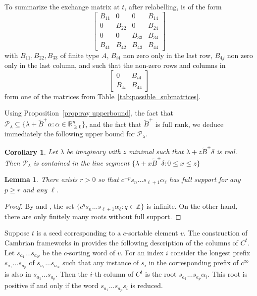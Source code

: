 \documentclass{amsart}
\newcommand{\sayDR}[1]{\say[DR]{\color{red}\;#1}}
\newtheorem{corollary}[theorem]{Corollary}
\newtheorem{lemma}[theorem]{Lemma}
\numberwithin{theorem}{section}
\newcommand{\cP}{\mathcal{P}}
\newcommand{\RR}{\mathbb{R}}
\newcommand{\ZZ}{\mathbb{Z}}
\begin{document}
  To summarize the exchange matrix at $t$, after relabelling, is of the form
    \[
      \left[
      \begin{array}{cccc} 
        B_{11} & 0 & 0 & B_{14} \\ 
        0 & B_{22} & 0 & B_{24} \\
        0 & 0 & B_{33} & B_{34} \\
        B_{41} & B_{42} & B_{43} & B_{44}
      \end{array}
      \right]
    \] 
    with $B_{11}, B_{22}, B_{33}$ of finite type $A$, $B_{i4}$ non zero only in the last row, $B_{4j}$ non zero only in the last column, and such that the non-zero rows and columns in 
    \[
      \left[
      \begin{array}{cc} 
        0 & B_{i4} \\ 
        B_{4i} & B_{44}
      \end{array}
      \right]
    \] 
    form one of the matrices from Table~\ref{tab:possible_submatrices}.


  Using Proposition~\ref{prop:ray upperbound}, the fact that $\cP_\lambda\subseteq \{\lambda + \widetilde B^+ \alpha : \alpha \in  \RR_{\ge0}^n\}$, and the fact that $\widetilde B^+$ is full rank, we deduce immediately the following upper bound for $\cP_\lambda$.
  \begin{corollary}
    \label{cor:upperbound}
    Let $\lambda$ be imaginary with $z$ minimal such that $\lambda+z\widetilde B^+\delta$ is real.
    Then $\cP_\lambda$ is contained in the line segment $\{\lambda+x\widetilde B^+\delta: 0\le x\le z\}$
  \end{corollary}


  \begin{lemma}
    \label{le:coxeter power}
    There exists $r>0$ so that $c^{-p} s_n \ldots s_{\ell+1} \alpha_\ell$ has full support for any $p\ge r$ and any $\ell$.
  \end{lemma}
  \begin{proof}
    By \cite[Theorem 1.2(1)]{Reading-Stella} and \cite[Section 1]{Dlab-Ringel}, the set $\{c^q s_n \ldots s_{\ell+1} \alpha_\ell:q\in\ZZ\}$ is infinite.
    On the other hand, there are only finitely many roots without full support.
  \end{proof}

  Suppose $t$ is a seed corresponding to a $c$-sortable element $v$.
  The construction of Cambrian frameworks in \cite{Combinatorial_frameworks_for_cluster_algebras} \sayDR{after Prop 5.4} provides the following description of the columns of $C^t$.
  Let $s_{a_1}\dots s_{a_N}$ be the $c$-sorting word of $v$. 
  For an index $i$ consider the longest prefix $s_{a_1} \dots s_{a_p}$ of $s_{a_1}\dots s_{a_N}$ such that any instance of $s_i$ in the corresponding prefix of $c^\infty$ is also in $s_{a_1} \dots s_{a_p}$.
  Then the $i$-th column of $C^t$ is the root $s_{a_1} \dots s_{a_p}\alpha_i$.
  This root is positive if and only if the word $s_{a_1} \dots s_{a_p} s_i$ is reduced.
\end{document}
